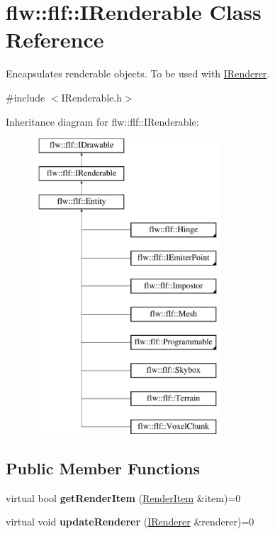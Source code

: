 \hypertarget{classflw_1_1flf_1_1IRenderable}{}\section{flw\+:\+:flf\+:\+:I\+Renderable Class Reference}
\label{classflw_1_1flf_1_1IRenderable}


Encapsulates renderable objects. To be used with \hyperlink{classflw_1_1flf_1_1IRenderer}{I\+Renderer}.  




{\ttfamily \#include $<$I\+Renderable.\+h$>$}

Inheritance diagram for flw\+:\+:flf\+:\+:I\+Renderable\+:\begin{figure}[H]
\begin{center}
\leavevmode
\includegraphics[height=11.000000cm]{classflw_1_1flf_1_1IRenderable}
\end{center}
\end{figure}
\subsection*{Public Member Functions}
\begin{DoxyCompactItemize}
\item 
\mbox{\label{classflw_1_1flf_1_1IRenderable_a6605511b25801afe480d6c98af0394c8}} 
virtual bool {\bfseries get\+Render\+Item} (\hyperlink{structflw_1_1flf_1_1RenderItem}{Render\+Item} \&item)=0
\item 
\mbox{\label{classflw_1_1flf_1_1IRenderable_af31d698aaefd2171ce2efa1356c1e795}} 
virtual void {\bfseries update\+Renderer} (\hyperlink{classflw_1_1flf_1_1IRenderer}{I\+Renderer} \&renderer)=0
\end{DoxyCompactItemize}


